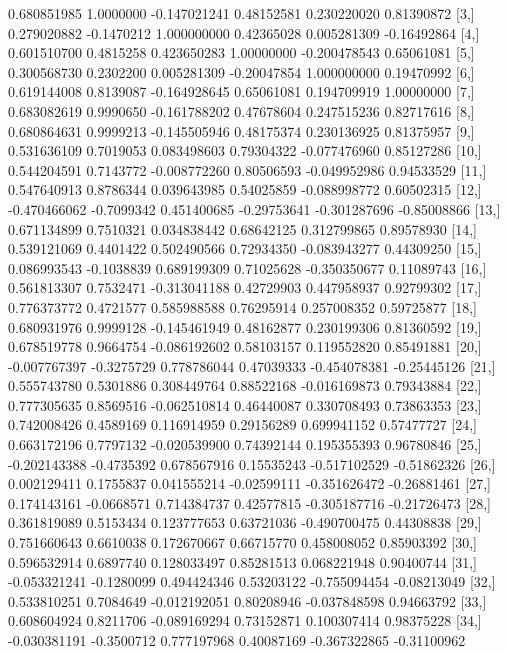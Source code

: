 \documentclass[a4paper,11pt]{scrartcl}
\begin{document}
\begin{Schunk}
\begin{Soutput}
 [2,]  0.680851985  1.0000000 -0.147021241  0.48152581  0.230220020  0.81390872
 [3,]  0.279020882 -0.1470212  1.000000000  0.42365028  0.005281309 -0.16492864
 [4,]  0.601510700  0.4815258  0.423650283  1.00000000 -0.200478543  0.65061081
 [5,]  0.300568730  0.2302200  0.005281309 -0.20047854  1.000000000  0.19470992
 [6,]  0.619144008  0.8139087 -0.164928645  0.65061081  0.194709919  1.00000000
 [7,]  0.683082619  0.9990650 -0.161788202  0.47678604  0.247515236  0.82717616
 [8,]  0.680864631  0.9999213 -0.145505946  0.48175374  0.230136925  0.81375957
 [9,]  0.531636109  0.7019053  0.083498603  0.79304322 -0.077476960  0.85127286
[10,]  0.544204591  0.7143772 -0.008772260  0.80506593 -0.049952986  0.94533529
[11,]  0.547640913  0.8786344  0.039643985  0.54025859 -0.088998772  0.60502315
[12,] -0.470466062 -0.7099342  0.451400685 -0.29753641 -0.301287696 -0.85008866
[13,]  0.671134899  0.7510321  0.034838442  0.68642125  0.312799865  0.89578930
[14,]  0.539121069  0.4401422  0.502490566  0.72934350 -0.083943277  0.44309250
[15,]  0.086993543 -0.1038839  0.689199309  0.71025628 -0.350350677  0.11089743
[16,]  0.561813307  0.7532471 -0.313041188  0.42729903  0.447958937  0.92799302
[17,]  0.776373772  0.4721577  0.585988588  0.76295914  0.257008352  0.59725877
[18,]  0.680931976  0.9999128 -0.145461949  0.48162877  0.230199306  0.81360592
[19,]  0.678519778  0.9664754 -0.086192602  0.58103157  0.119552820  0.85491881
[20,] -0.007767397 -0.3275729  0.778786044  0.47039333 -0.454078381 -0.25445126
[21,]  0.555743780  0.5301886  0.308449764  0.88522168 -0.016169873  0.79343884
[22,]  0.777305635  0.8569516 -0.062510814  0.46440087  0.330708493  0.73863353
[23,]  0.742008426  0.4589169  0.116914959  0.29156289  0.699941152  0.57477727
[24,]  0.663172196  0.7797132 -0.020539900  0.74392144  0.195355393  0.96780846
[25,] -0.202143388 -0.4735392  0.678567916  0.15535243 -0.517102529 -0.51862326
[26,]  0.002129411  0.1755837  0.041555214 -0.02599111 -0.351626472 -0.26881461
[27,]  0.174143161 -0.0668571  0.714384737  0.42577815 -0.305187716 -0.21726473
[28,]  0.361819089  0.5153434  0.123777653  0.63721036 -0.490700475  0.44308838
[29,]  0.751660643  0.6610038  0.172670667  0.66715770  0.458008052  0.85903392
[30,]  0.596532914  0.6897740  0.128033497  0.85281513  0.068221948  0.90400744
[31,] -0.053321241 -0.1280099  0.494424346  0.53203122 -0.755094454 -0.08213049
[32,]  0.533810251  0.7084649 -0.012192051  0.80208946 -0.037848598  0.94663792
[33,]  0.608604924  0.8211706 -0.089169294  0.73152871  0.100307414  0.98375228
[34,] -0.030381191 -0.3500712  0.777197968  0.40087169 -0.367322865 -0.31100962

\end{Soutput}
\end{Schunk}
\end{document}
